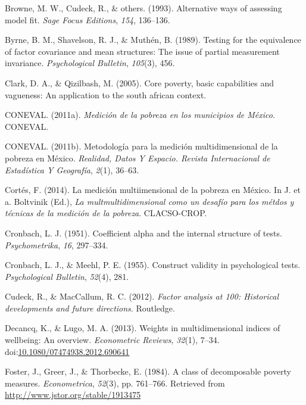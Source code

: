 \documentclass[]{book}
\begin{document}
\leavevmode\hypertarget{ref-Browne1993}{}%
Browne, M. W., Cudeck, R., \& others. (1993). Alternative ways of assessing model fit. \emph{Sage Focus Editions}, \emph{154}, 136--136.

\leavevmode\hypertarget{ref-Byrne1989}{}%
Byrne, B. M., Shavelson, R. J., \& Muthén, B. (1989). Testing for the equivalence of factor covariance and mean structures: The issue of partial measurement invariance. \emph{Psychological Bulletin}, \emph{105}(3), 456.

\leavevmode\hypertarget{ref-Clark2005}{}%
Clark, D. A., \& Qizilbash, M. (2005). Core poverty, basic capabilities and vagueness: An application to the south african context.

\leavevmode\hypertarget{ref-CONEVAL2011a}{}%
CONEVAL. (2011a). \emph{Medición de la pobreza en los municipios de México}. CONEVAL.

\leavevmode\hypertarget{ref-CONEVAL2011d}{}%
CONEVAL. (2011b). Metodología para la medición multidimensional de la pobreza en México. \emph{Realidad, Datos Y Espacio. Revista Internacional de Estadística Y Geografía}, \emph{2}(1), 36--63.

\leavevmode\hypertarget{ref-Cortes2014}{}%
Cortés, F. (2014). La medición multiimensional de la pobreza en México. In J. et a. Boltvinik (Ed.), \emph{La multmultidimensional como un desafío para los métdos y técnicas de la medición de la pobreza}. CLACSO-CROP.

\leavevmode\hypertarget{ref-Cronbach1951}{}%
Cronbach, L. J. (1951). Coefficient alpha and the internal structure of tests. \emph{Psychometrika}, \emph{16}, 297--334.

\leavevmode\hypertarget{ref-Cronbach1955}{}%
Cronbach, L. J., \& Meehl, P. E. (1955). Construct validity in psychological tests. \emph{Psychological Bulletin}, \emph{52}(4), 281.

\leavevmode\hypertarget{ref-Cudeck2012}{}%
Cudeck, R., \& MacCallum, R. C. (2012). \emph{Factor analysis at 100: Historical developments and future directions}. Routledge.

\leavevmode\hypertarget{ref-Decancq2013}{}%
Decancq, K., \& Lugo, M. A. (2013). Weights in multidimensional indices of wellbeing: An overview. \emph{Econometric Reviews}, \emph{32}(1), 7--34. doi:\href{https://doi.org/10.1080/07474938.2012.690641}{10.1080/07474938.2012.690641}

\leavevmode\hypertarget{ref-Foster1984}{}%
Foster, J., Greer, J., \& Thorbecke, E. (1984). A class of decomposable poverty measures. \emph{Econometrica}, \emph{52}(3), pp. 761--766. Retrieved from \url{http://www.jstor.org/stable/1913475}
\end{document}
